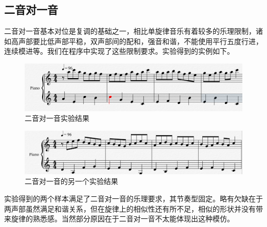 \documentclass[UTF8,a4paper,10pt]{ctexart}
\begin{document}
    \subsection{二音对一音}
    二音对一音基本对位是复调的基础之一，相比单旋律音乐有着较多的乐理限制，诸如高声部要比低声部平稳，双声部间的配和，强音和谐，不能使用平行五度行进，连续模进等。我们在程序中实现了这些限制要求。实验得到的实例如下。
    \begin{figure}[H]
        \begin{center}
            \includegraphics[width=1.0\columnwidth]{eg2.PNG}
            \caption{二音对一音实验结果}
        \end{center}
    \end{figure}
    \begin{figure}[H]
        \begin{center}
            \includegraphics[width=1.0\columnwidth]{eg3.PNG}
            \caption{二音对一音的另一个实验结果}
        \end{center}
    \end{figure}
    实验得到的两个样本满足了二音对一音的乐理要求，其节奏型固定。略有欠缺在于两声部虽然满足和谐关系，但在旋律上的相似性还有所不足，相似的形状并没有带来旋律的熟悉感。当然部分原因在于二音对一音不太能体现出这种模仿。
\end{document}
